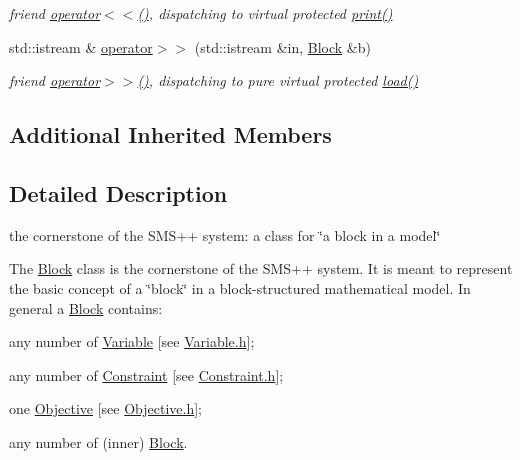 \begin{DoxyCompactItemize}
\begin{DoxyCompactList}\small\item\em friend \mbox{\hyperlink{class_s_m_spp__di__unipi__it_1_1_block_aaf14d09576853bb38438285dacb32655}{operator$<$$<$()}}, dispatching to virtual protected \mbox{\hyperlink{class_s_m_spp__di__unipi__it_1_1_block_a2e7b9c9148a98c5c342e8c25cac95926}{print()}} \end{DoxyCompactList}\item 
std\+::istream \& \mbox{\hyperlink{class_s_m_spp__di__unipi__it_1_1_block_a7124899e39ee61687c43c1061d3a0353}{operator$>$$>$}} (std\+::istream \&in, \mbox{\hyperlink{class_s_m_spp__di__unipi__it_1_1_block}{Block}} \&b)
\begin{DoxyCompactList}\small\item\em friend \mbox{\hyperlink{class_s_m_spp__di__unipi__it_1_1_block_a7124899e39ee61687c43c1061d3a0353}{operator$>$$>$()}}, dispatching to {\itshape pure} virtual protected \mbox{\hyperlink{class_s_m_spp__di__unipi__it_1_1_block_a27ae9e4279482d52342c7958c34a43c6}{load()}} \end{DoxyCompactList}\end{DoxyCompactItemize}
\subsection*{Additional Inherited Members}


\subsection{Detailed Description}
the cornerstone of the S\+M\+S++ system\+: a class for \char`\"{}a block in a model\char`\"{} 

The \mbox{\hyperlink{class_s_m_spp__di__unipi__it_1_1_block}{Block}} class is the cornerstone of the S\+M\+S++ system. It is meant to represent the basic concept of a \char`\"{}block\char`\"{} in a block-\/structured mathematical model. In general a \mbox{\hyperlink{class_s_m_spp__di__unipi__it_1_1_block}{Block}} contains\+:


\begin{DoxyItemize}
\item any number of \mbox{\hyperlink{class_s_m_spp__di__unipi__it_1_1_variable}{Variable}} \mbox{[}see \mbox{\hyperlink{_variable_8h}{Variable.\+h}}\mbox{]};
\item any number of \mbox{\hyperlink{class_s_m_spp__di__unipi__it_1_1_constraint}{Constraint}} \mbox{[}see \mbox{\hyperlink{_constraint_8h}{Constraint.\+h}}\mbox{]};
\item one \mbox{\hyperlink{class_s_m_spp__di__unipi__it_1_1_objective}{Objective}} \mbox{[}see \mbox{\hyperlink{_objective_8h}{Objective.\+h}}\mbox{]};
\item any number of (inner) \mbox{\hyperlink{class_s_m_spp__di__unipi__it_1_1_block}{Block}}.
\end{DoxyItemize}

